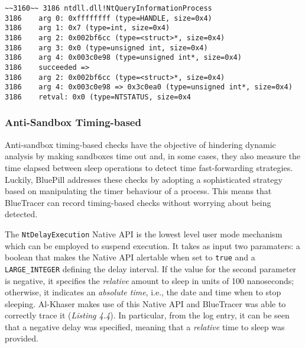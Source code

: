 \vspace{0.5cm}
\begin{lstlisting}[caption={Log entry relative to \texttt{NtQueryInformationProcess}},captionpos=b]
~~3160~~ 3186 ntdll.dll!NtQueryInformationProcess
3186 	arg 0: 0xffffffff (type=HANDLE, size=0x4)
3186 	arg 1: 0x7 (type=int, size=0x4)
3186 	arg 2: 0x002bf6cc (type=<struct>*, size=0x4)
3186 	arg 3: 0x0 (type=unsigned int, size=0x4)
3186 	arg 4: 0x003c0e98 (type=unsigned int*, size=0x4)
3186    succeeded =>
3186 	arg 2: 0x002bf6cc (type=<struct>*, size=0x4)
3186 	arg 4: 0x003c0e98 => 0x3c0ea0 (type=unsigned int*, size=0x4)
3186 	retval: 0x0 (type=NTSTATUS, size=0x4
\end{lstlisting}

\subsubsection*{Anti-Sandbox Timing-based}

Anti-sandbox timing-based checks have the objective of hindering dynamic analysis by making sandboxes time out and, in some cases, they also measure the time elapsed between sleep operations to detect time fast-forwarding strategies. Luckily, BluePill \cite{BluePill} addresses these checks by adopting a sophisticated strategy based on manipulating the timer behaviour of a process. This means that BlueTracer can record timing-based checks without worrying about being detected.

The \texttt{NtDelayExecution} Native API is the lowest level user mode mechanism which can be employed to suspend execution. It takes as input two paramaters: a boolean that makes the Native API alertable when set to \texttt{true} and a \texttt{LARGE\_INTEGER} defining the delay interval. If the value for the second parameter is negative, it specifies the \textit{relative} amount to sleep in units of 100 nanoseconds; otherwise, it indicates an \textit{absolute time}, i.e., the date and time when to stop sleeping. Al-Khaser makes use of this Native API and BlueTracer was able to correctly trace it (\textit{Listing 4.4}). In particular, from the log entry, it can be seen that a negative delay was specified, meaning that a \textit{relative} time to sleep was provided.  


